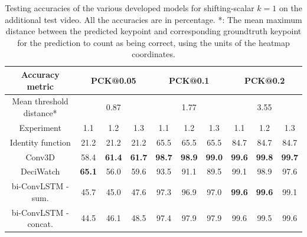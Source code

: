 \documentclass[./main.tex]{subfiles}
\begin{document}
\begin{table}[htbp]
    \begin{tabular}{c||ccc|ccc|ccc}
        \hline
        Accuracy metric & \multicolumn{3}{c}{PCK@0.05} & \multicolumn{3}{c}{PCK@0.1} & \multicolumn{3}{c}{PCK@0.2} \\
        \hline
        Mean threshold distance* & \multicolumn{3}{c}{0.87} & \multicolumn{3}{c}{1.77} & \multicolumn{3}{c}{3.55} \\
        \hline
        Experiment & 1.1 & 1.2 & 1.3 & 1.1 & 1.2 & 1.3 & 1.1 & 1.2 & 1.3 \\
        \hline
        \hline
        Identity function & 21.2 & 21.2 & 21.2 & 65.5 & 65.5 & 65.5 & 84.7 & 84.7 & 84.7 \\
        Conv3D & 58.4 & \textbf{61.4} & \textbf{61.7} & \textbf{98.7} & \textbf{98.9} & \textbf{99.0} & \textbf{99.6} & \textbf{99.8} & \textbf{99.7} \\
        DeciWatch & \textbf{65.1} & 56.0 & 59.6 & 93.5 & 91.1 & 89.5 & 99.1 & 98.9 & 97.6 \\
        bi-ConvLSTM - sum. & 45.7 & 45.0 & 47.6 & 97.3 & 96.9 & 97.0 & \textbf{99.6} & \textbf{99.6} & 99.1 \\
        bi-ConvLSTM - concat. & 44.5 & 46.1 & 48.5 & 97.4 & 97.9 & 97.9 & 99.6 & 99.5 & 99.6 \\
        \hline
    \end{tabular}
    \caption{Testing accuracies of the various developed models for shifting-scalar $k = 1$ on the additional test video. All the accuracies are in percentage. *: The mean maximum distance between the predicted keypoint and corresponding groundtruth keypoint for the prediction to count as being correct, using the units of the heatmap coordinates.}
    \label{tab:finetune_test_accs_3}
\end{table}
\end{document}
